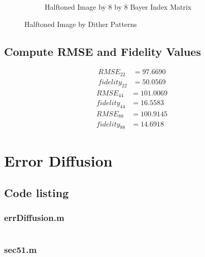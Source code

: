 \documentclass{article}
\begin{document}
\begin{figure}[h]
\begin{subfigure}{1.0\textwidth}
\begin{center}
				\caption{Halftoned Image by 8 by 8 Bayer Index Matrix}
			\end{center}
		\end{subfigure}
		\caption{Halftoned Image by Dither Patterns}
	\end{figure}

\subsection{Compute RMSE and Fidelity Values}
	\begin{align*}
		RMSE_{22} &= 97.6690 \\
		fidelity_{22} &= 50.0569
	\end{align*}
	\begin{align*}
		RMSE_{44} &= 101.0069 \\
		fidelity_{44} &= 16.5583
	\end{align*}
	\begin{align*}
		RMSE_{88} &= 100.9145 \\
		fidelity_{88} &= 14.6918
	\end{align*}


\section{Error Diffusion}

\subsection{Code listing}
	\subsubsection{errDiffusion.m}
	\inputminted[tabsize=2]{matlab}{../source/errDiffusion.m}
	\subsubsection{sec51.m}
	\inputminted[tabsize=2]{matlab}{../source/sec51.m}
\end{document}

